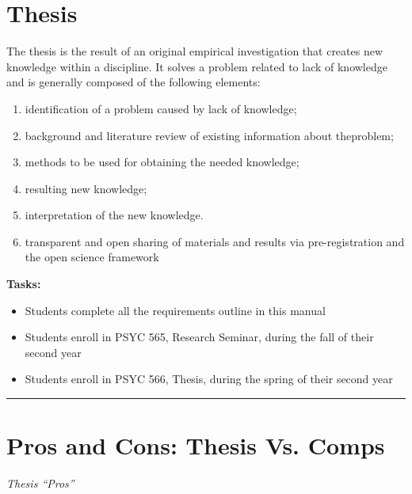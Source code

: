 \documentclass[openany]{book}
\providecommand{\tightlist}{%
  \setlength{\itemsep}{0pt}\setlength{\parskip}{0pt}}
\begin{document}
\hypertarget{thesis}{%
\section{Thesis}\label{thesis}}

The thesis is the result of an original empirical investigation that creates new knowledge within a discipline. It solves a problem related to lack of knowledge and is generally composed of the following elements:

\begin{enumerate}
\def\labelenumi{\arabic{enumi}.}
\tightlist
\item
  identification of a problem caused by lack of knowledge;
\item
  background and literature review of existing information about theproblem;
\item
  methods to be used for obtaining the needed knowledge;
\item
  resulting new knowledge;
\item
  interpretation of the new knowledge.
\item
  transparent and open sharing of materials and results via pre-registration and the open science framework
\end{enumerate}

\textbf{Tasks:}

\begin{itemize}
\tightlist
\item
  Students complete all the requirements outline in this manual
\item
  Students enroll in PSYC 565, Research Seminar, during the fall of their second year
\item
  Students enroll in PSYC 566, Thesis, during the spring of their second year
\end{itemize}

\begin{center}\rule{0.5\linewidth}{0.5pt}\end{center}

\hypertarget{pros-and-cons-thesis-vs.-comps}{%
\section{Pros and Cons: Thesis Vs. Comps}\label{pros-and-cons-thesis-vs.-comps}}

\emph{Thesis ``Pros''}
\end{document}
